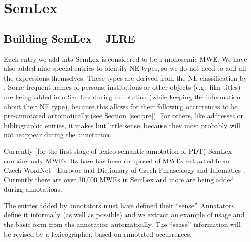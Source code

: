 \chapter{SemLex}
\label{sec:semlex}

\section{Building SemLex – JLRE}
\label{sec:semlex:build}
Each entry we add into SemLex is considered to be a monosemic MWE. 
We have also added nine special entries to identify NE types, so we do not need to add all the expressions themselves.
These types are derived from the NE classification by \citealp{sevcikova:2007}.
%
Some frequent names of persons, institutions or other objects (e.g.~film titles) are being added into SemLex during annotation (while keeping the information about their NE type), because this allows for their following occurrences to be pre-annotated automatically (see Section~\ref{sec:pre}). For others, like addresses or bibliographic entries, it makes but little sense, because they most probably will not reappear during the annotation. 

Currently (for the first stage of lexico-semantic annotation of PDT) SemLex contains only MWEs. Its base has been composed of MWEs extracted from Czech WordNet \citep{smrz:03}, Eurovoc \citep{eurovoc:07} and Dictionary of Czech Phraseology and Idiomatics \citep{cermak:1988}.%
Currently there are over 30,000 MWEs in SemLex and more are being added during annotations.


The entries added by annotators must have defined their ``sense''. Annotators define it informally (as well as possible) and we extract an example of usage and the basic form from the annotation automatically. The ``sense'' information will be revised by a lexicographer, based on annotated occurrences.